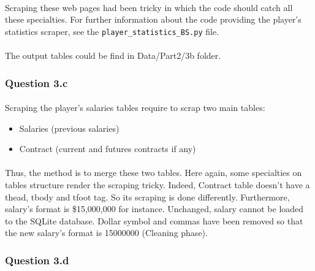 \paragraph{}Scraping these web pages had been tricky in which the code should catch all these specialties. For further information about the code providing the player's statistics scraper, see the \verb|player_statistics_BS.py| file.

\paragraph{}The output tables could be find in Data/Part2/3b folder.

\subsubsection{Question 3.c}
\label{subsubsec:313c}

\paragraph{}Scraping the player's salaries tables require to scrap two main tables:

\begin{itemize}
	\item Salaries (previous salaries)
	\item Contract (current and futures contracts if any)
\end{itemize}

\paragraph{}Thus, the method is to merge these two tables. Here again, some specialties on tables structure render the scraping tricky. Indeed, Contract table doesn't have a thead, tbody and tfoot tag. So its scraping is done differently. Furthermore, salary's format is \$15,000,000 for instance. Unchanged, salary cannot be loaded to the SQLite database. Dollar symbol and commas have been removed so that the new salary's format is 15000000 (Cleaning phase).

\subsubsection{Question 3.d}
\label{subsubsec:313d}
